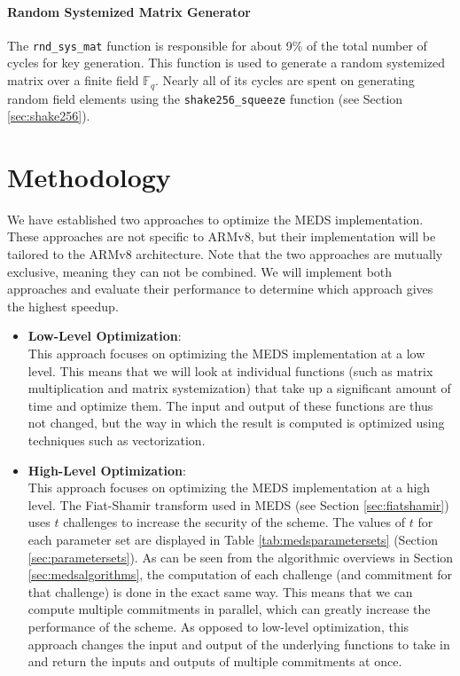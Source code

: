 \documentclass[11pt,a4paper]{report}
\theoremstyle{definition}
\begin{document}
\subsubsection{Random Systemized Matrix Generator}
The \texttt{rnd\_sys\_mat} function is responsible for about 9\% of the total number of cycles for key generation. This function is used to generate a random systemized matrix over a finite field $\mathbb{F}_q$. Nearly all of its cycles are spent on generating random field elements using the \texttt{shake256\_squeeze} function (see Section \ref{sec:shake256}).

\chapter{Methodology}
\label{ch:methodology}
We have established two approaches to optimize the MEDS implementation. These approaches are not specific to ARMv8, but their implementation will be tailored to the ARMv8 architecture. Note that the two approaches are mutually exclusive, meaning they can not be combined. We will implement both approaches and evaluate their performance to determine which approach gives the highest speedup.
\begin{itemize}
  \item \textbf{Low-Level Optimization}:\\
  This approach focuses on optimizing the MEDS implementation at a low level. This means that we will look at individual functions (such as matrix multiplication and matrix systemization) that take up a significant amount of time and optimize them. The input and output of these functions are thus not changed, but the way in which the result is computed is optimized using techniques such as vectorization.
  \item \textbf{High-Level Optimization}:\\
  This approach focuses on optimizing the MEDS implementation at a high level. The Fiat-Shamir transform used in MEDS (see Section \ref{sec:fiatshamir}) uses $t$ challenges to increase the security of the scheme. The values of $t$ for each parameter set are displayed in Table \ref{tab:medsparametersets} (Section \ref{sec:parametersets}). As can be seen from the algorithmic overviews in Section \ref{sec:medsalgorithms}, the computation of each challenge (and commitment for that challenge) is done in the exact same way. This means that we can compute multiple commitments in parallel, which can greatly increase the performance of the scheme. As opposed to low-level optimization, this approach changes the input and output of the underlying functions to take in and return the inputs and outputs of multiple commitments at once.
\end{itemize}
\end{document}

